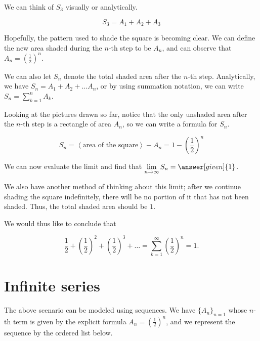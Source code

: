 \documentclass{ximera}
\begin{document}
\begin{example}
We can think of $S_3$ visually or analytically. 

\[
S_3 = A_1 + A_2 + A_3
\]



\vspace{3mm}



Hopefully, the pattern used to shade the square is becoming clear.  We can define the new area shaded during the $n$-th step to be $A_n$, and can observe that $A_n = \left( \frac{1}{2} \right)^n$.

We can also let $S_n$ denote the total shaded area after the $n$-th step.  Analytically, we have $S_n = A_1+A_2 + \ldots A_n$, or by using summation notation, we can write $\displaystyle S_n = \sum_{k=1}^n A_k$.

Looking at the pictures drawn so far, notice that the only unshaded area after the $n$-th step is a rectangle of area $A_n$, so we can write a formula for $S_n$.   

\[
S_n = \left<\textrm{area of the square}\right>-A_n = 1-\left(\frac{1}{2}\right)^n
\]

We can now evaluate the limit and find that $\lim\limits_{n \to \infty} S_n =\answer[given]{1}$.

We also have another method of thinking about this limit; after we continue shading the square indefinitely, there will be no portion of it that has not been shaded.  Thus, the total shaded area should be $1$.

We would thus like to conclude that

\[
\frac{1}{2} + \left(\frac{1}{2}\right)^2+ \left(\frac{1}{2}\right)^3+ \ldots = \sum\limits_{k=1}^{\infty} \left(\frac{1}{2}\right)^n =1.
\]
\end{example}

















\section{Infinite series}
The above scenario can be modeled using sequences.  We have $\{A_n\}_{n=1}$ whose $n$-th term is given by the explicit formula $A_n=\left(\frac{1}{2}\right)^n$, and we represent the sequence by the ordered list below.
\end{document}
